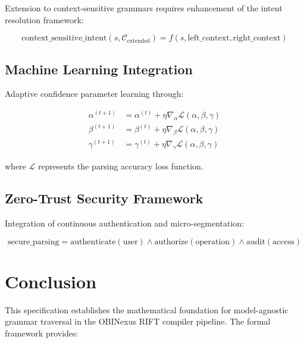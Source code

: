 \documentclass[11pt,a4paper]{article}
\theoremstyle{definition}
\theoremstyle{remark}
\begin{document}
Extension to context-sensitive grammars requires enhancement of the intent resolution framework:

\begin{equation}
\text{context\_sensitive\_intent}(s, \mathcal{C}_{\text{extended}}) = f(s, \text{left\_context}, \text{right\_context})
\end{equation}

\subsection{Machine Learning Integration}
\label{subsec:ml-integration}

Adaptive confidence parameter learning through:

\begin{align}
\alpha^{(t+1)} &= \alpha^{(t)} + \eta \nabla_\alpha \mathcal{L}(\alpha, \beta, \gamma) \\
\beta^{(t+1)} &= \beta^{(t)} + \eta \nabla_\beta \mathcal{L}(\alpha, \beta, \gamma) \\
\gamma^{(t+1)} &= \gamma^{(t)} + \eta \nabla_\gamma \mathcal{L}(\alpha, \beta, \gamma)
\end{align}

where $\mathcal{L}$ represents the parsing accuracy loss function.

\subsection{Zero-Trust Security Framework}
\label{subsec:zero-trust}

Integration of continuous authentication and micro-segmentation:

\begin{equation}
\text{secure\_parsing} = \text{authenticate}(\text{user}) \land \text{authorize}(\text{operation}) \land \text{audit}(\text{access})
\end{equation}


\section{Conclusion}
\label{sec:conclusion}

This specification establishes the mathematical foundation for model-agnostic grammar traversal in the OBINexus RIFT compiler pipeline. The formal framework provides:
\end{document}

